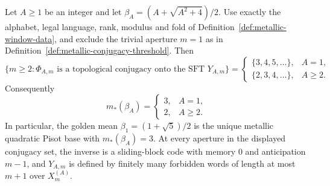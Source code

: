 \begin{theorem}
\label{thm:metallic-threshold-classification}
Let $A\ge1$ be an integer and let
$\beta_A=(A+\sqrt{A^2+4})/2$.  Use exactly the alphabet, legal language,
rank, modulus and fold of Definition~\ref{def:metallic-window-data}, and
exclude the trivial aperture $m=1$ as in
Definition~\ref{def:metallic-conjugacy-threshold}.  Then
\[
\{m\ge2:\Phi_{A,m}\text{ is a topological conjugacy onto the SFT }
Y_{A,m}\}
=
\begin{cases}
\{3,4,5,\ldots\},&A=1,\\
\{2,3,4,\ldots\},&A\ge2.
\end{cases}
\]
Consequently
\begin{equation}\label{eq:metallic-threshold-function}
m_*(\beta_A)=
\begin{cases}
3,&A=1,\\
2,&A\ge2.
\end{cases}
\end{equation}
In particular, the golden mean
$\beta_1=(1+\sqrt5)/2$ is the unique metallic quadratic Pisot base with
$m_*(\beta_A)=3$.  At every aperture in the displayed conjugacy set, the
inverse is a sliding-block code with memory $0$ and anticipation $m-1$, and
$Y_{A,m}$ is defined by finitely many forbidden words of length at most
$m+1$ over $X_m^{(A)}$.
\end{theorem}

